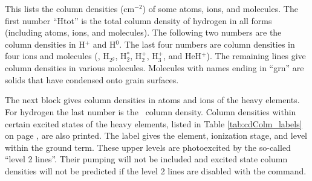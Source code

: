 This lists the column densities (cm$^{-2}$) of some atoms,
ions, and molecules.
The first number ``Htot'' is the total column density of hydrogen in all
forms (including atoms, ions, and molecules).
The following two numbers
are the column densities in H$^+$ and H$^0$.
The last four numbers are column
densities in four ions and molecules (\hminus, H$_{2^{g}}$, H$_2^*$,
H$_2^+$, H$_3^+$, and HeH$^+$).
The remaining lines give column densities in various molecules.
Molecules with names ending in ``grn'' are solids that have
condensed onto grain surfaces.

The next block gives column densities in atoms and ions of the heavy
elements.
For hydrogen the last number is the \htwo\ column density.
Column
densities within certain excited states of the heavy elements,
listed in Table \ref{tab:cdColm_labels} on page \pageref{tab:cdColm_labels}, are also printed.
The label gives the
element, ionization stage, and level within the ground term.
These upper
levels are photoexcited by the so-called ``level 2 lines''.
Their pumping
will not be included and excited state column densities will not be predicted
if the level 2 lines are disabled with the  command.


